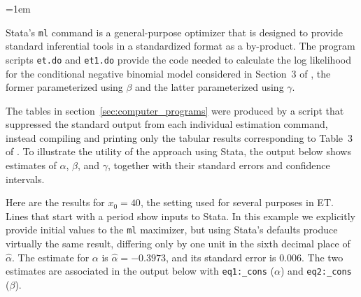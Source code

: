 
\parindent=1em

Stata's \texttt{ml} command is a general-purpose optimizer that is designed to provide standard inferential tools in a standardized format as a by-product.  The program scripts \texttt{et.do} and \texttt{et1.do} provide the code needed to calculate the log likelihood for the conditional negative binomial model considered in Section~3 of \citet{Efron:1976zs}, the former parameterized using $\beta$ and the latter parameterized using $\gamma$.

The tables in section~\ref{sec:computer_programs} were produced by a script that suppressed the standard output from each individual estimation command, instead compiling and printing only the tabular results corresponding to Table~3 of \citeauthor{Efron:1976zs}.  To illustrate the utility of the approach using Stata, the output below shows estimates of $\alpha$, $\beta$, and $\gamma$, together with their standard errors and confidence intervals.

Here are the results for $x_0=40$, the setting used for several purposes in ET.  Lines that start with a period show inputs to Stata.  In this example we explicitly provide initial values to the \texttt{ml} maximizer, but using Stata's defaults produce virtually the same result, differing only by one unit in the sixth decimal place of $\hat\alpha$.  The estimate for $\alpha$ is $\hat\alpha=-0.3973$, and its standard error is $0.006$.  The two estimates are associated in the output below with \texttt{eq1:\_cons} ($\alpha$) and \texttt{eq2:\_cons} ($\beta$).

